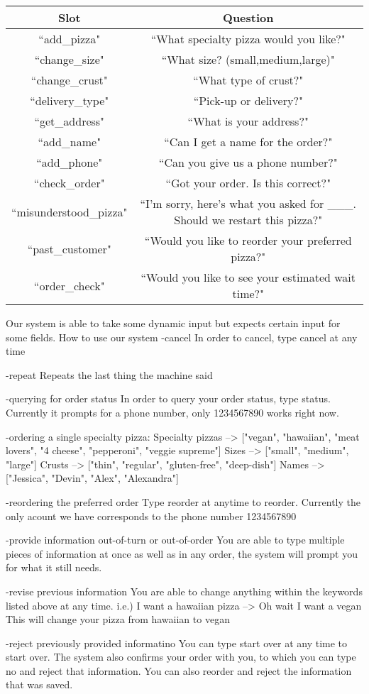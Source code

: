 \documentclass{article}
\begin{document}
\begin{tabular}{|c|c|}
\hline
Slot & Question \\\hline
``add\_pizza" & ``What specialty pizza would you like?"\\\hline
``change\_size" & ``What size? (small,medium,large)"\\\hline
``change\_crust" & ``What type of crust?"\\\hline
``delivery\_type" & ``Pick-up or delivery?"\\\hline
``get\_address" & ``What is your address?"\\\hline
``add\_name" & ``Can I get a name for the order?"\\\hline
``add\_phone" & ``Can you give us a phone number?"\\\hline
``check\_order" & ``Got your order. Is this correct?"\\\hline
``misunderstood\_pizza" & ``I'm sorry, here's what you asked for \_\_\_. Should we restart this pizza?"\\\hline
``past\_customer" & ``Would you like to reorder your preferred pizza?"\\\hline
``order\_check" & ``Would you like to see your estimated wait time?"\\\hline
\end{tabular}

Our system is able to take some dynamic input but expects certain input for some fields.
How to use our system\:
-cancel
In order to cancel, type cancel at any time

-repeat
Repeats the last thing the machine said

-querying for order status
In order to query your order status, type status.
Currently it prompts for a phone number, only 1234567890 works right now.

-ordering a single specialty pizza:
Specialty pizzas --> ["vegan", "hawaiian", "meat lovers", "4 cheese", "pepperoni", "veggie supreme"]
Sizes --> ["small", "medium", "large"]
Crusts --> ["thin", "regular", "gluten-free", "deep-dish"]
Names --> ["Jessica", "Devin", "Alex", "Alexandra"]

-reordering the preferred order
Type reorder at anytime to reorder. Currently the only acount we have corresponds to the phone number 1234567890

-provide information out-of-turn or out-of-order
You are able to type multiple pieces of information at once as well as in any order, the system will prompt you for what it still needs.

-revise previous information
You are able to change anything within the keywords listed above at any time.
i.e.) I want a hawaiian pizza --> Oh wait I want a vegan
This will change your pizza from hawaiian to vegan

-reject previously provided informatino
You can type start over at any time to start over.
The system also confirms your order with you, to which you can type no and reject that information.
You can also reorder and reject the information that was saved.
\end{document}
